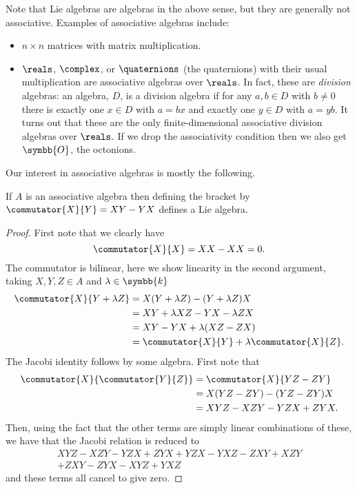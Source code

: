 \documentclass[fleqn]{NotesClass}
\renewcommand{\field}{\symbb{k}}
\begin{document}
    Note that Lie algebras are algebras in the above sense, but they are generally not associative.
    Examples of associative algebras include:
    \begin{itemize}
        \item \(n \times n\) matrices with matrix multiplication.
        \item \(\reals\), \(\complex\), or \(\quaternions\) (the quaternions) with their usual multiplication are associative algebras over \(\reals\).
        In fact, these are \emph{division} algebras: an algebra, \(D\), is a division algebra if for any \(a, b \in D\) with \(b \ne 0\) there is exactly one \(x \in D\) with \(a = bx\) and exactly one \(y \in D\) with \(a = yb\).
        It turns out that these are the only finite-dimensional associative division algebras over \(\reals\).
        If we drop the associativity condition then we also get \(\symbb{O}\), the octonions.
    \end{itemize}
    
    Our interest in associative algebras is mostly the following.
    
    \begin{lma}{}{}
        If \(A\) is an associative algebra then defining the bracket by \(\commutator{X}{Y} = XY - YX\) defines a Lie algebra.
        \begin{proof}
            First note that we clearly have
            \begin{equation}
                \commutator{X}{X} = XX - XX = 0.
            \end{equation}
            The commutator is bilinear, here we show linearity in the second argument, taking \(X, Y, Z \in A\) and \(\lambda \in \field\)
            \begin{align}
                \commutator{X}{Y + \lambda Z} &= X(Y + \lambda Z) - (Y + \lambda Z)X\\
                &= XY + \lambda XZ - YX - \lambda ZX\\
                &= XY - YX + \lambda (XZ - ZX)\\
                &= \commutator{X}{Y} + \lambda \commutator{X}{Z}.
            \end{align}
            The Jacobi identity follows by some algebra.
            First note that
            \begin{align}
                \commutator{X}{\commutator{Y}{Z}} &= \commutator{X}{YZ - ZY}\\
                &= X(YZ - ZY) - (YZ - ZY)X\\
                &= XYZ - XZY - YZX + ZYX.
            \end{align}
            Then, using the fact that the other terms are simply linear combinations of these, we have that the Jacobi relation is reduced to
            \begin{multline}
                XYZ - XZY - YZX + ZYX + YZX - YXZ - ZXY + XZY\\
                + ZXY - ZYX - XYZ + YXZ
            \end{multline}
            and these terms all cancel to give zero.
        \end{proof}
    \end{lma}
    
\end{document}
